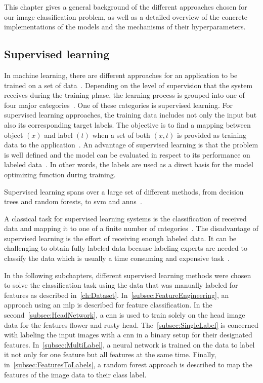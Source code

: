 \bigskip
This chapter gives a general background of the different approaches chosen for our image classification problem, as well as a detailed overview of the concrete implementations of the models and the mechanisms of their hyperparameters.  


\subsection{Supervised learning}
\label{sec:SupervisedLearning}

In machine learning, there are different approaches for an application to be trained on a set of data~\citep{geron2019hands,bishop2006pattern}. Depending on the level of supervision that the system receives during the training phase, the learning process is grouped into one of four major categories~\citep{geron2019hands}. One of these categories is supervised learning. For supervised learning approaches, the training data includes not only the input but also its corresponding target labels. The objective is to find a mapping between object \((x)\) and label \((t)\) when a set of both \((x,t)\) is provided as training data to the application~\citep{olivier2006semi}. An advantage of supervised learning is that the problem is well defined and the model can be evaluated in respect to its performance on labeled data~\citep{daume2012course,olivier2006semi}. In other words, the labels are used as a direct basis for the model optimizing function during training.

Supervised learning spans over a large set of different methods, from decision trees and random forests, to \acrfull{svm}  and \acrlong{ann}s~\citep{caruana2006comparison,geron2019hands}.

A classical task for supervised learning systems is the classification of received data and mapping it to one of a finite number of categories~\citep{bishop2006pattern}.
The disadvantage of supervised learning is the effort of receiving enough labeled data. It can be challenging to obtain fully labeled data because labeling experts are needed to classify the data which is usually a time consuming and expensive task~\citep{zhu05survey,figueroa2012predicting}.

\bigskip
In the following subchapters, different supervised learning methods were chosen to solve the classification task using the data that was manually labeled for features as described in~\autoref{ch:Dataset}. In~\autoref{subsec:FeatureEngineering}, an approach using an \acrshort{mlp} is described for feature classification. In the second~\autoref{subsec:HeadNetwork}, a \acrshort{cnn} is used to train solely on the head image data for the features flower and rusty head. The~\autoref{subsec:SingleLabel} is concerned with labeling the input images with a \acrshort{cnn} in a binary setup for their designated features. In~\autoref{subsec:MultiLabel}, a neural network is trained on the data to label it not only for one feature but all features at the same time.
Finally, in~\autoref{subsec:FeaturesToLabels}, a random forest approach is described to map the features of the image data to their class label.


